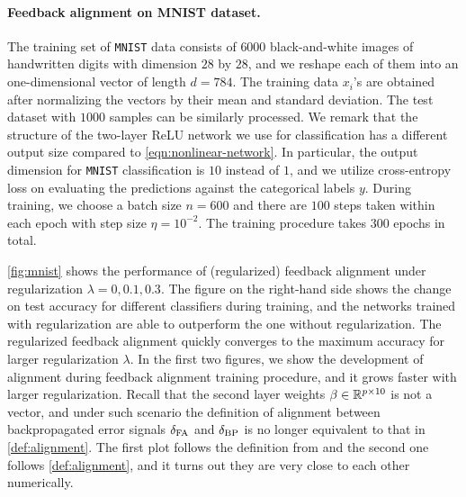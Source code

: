 \paragraph{Feedback alignment on MNIST dataset.}

The training set of \texttt{MNIST} data consists of $6000$ black-and-white images of handwritten digits with dimension $28$ by $28$, and we reshape each of them into an one-dimensional vector of length $d = 784$. The training data $x_i$'s are obtained after normalizing the vectors by their mean and standard deviation. The test dataset with $1000$ samples can be similarly processed. We remark that the structure of the two-layer ReLU network we use for classification has a different output size compared to \eqref{eqn:nonlinear-network}. In particular, the output dimension for \texttt{MNIST} classification is $10$ instead of $1$, and we utilize cross-entropy loss on evaluating the predictions against the categorical labels $y$. During training, we choose a batch size $n = 600$ and there are $100$ steps taken within each epoch with step size $\eta = 10^{-2}$. The training procedure takes $300$ epochs in total. 

\cref{fig:mnist} shows the performance of (regularized) feedback alignment under regularization $\lambda = 0, 0.1, 0.3$. The figure on the right-hand side shows the change on test accuracy for different classifiers during training, and the networks trained with regularization are able to outperform the one without regularization. The regularized feedback alignment quickly converges to the maximum accuracy for larger regularization $\lambda$. In the first two figures, we show the development of alignment during feedback alignment training procedure, and it grows faster with larger regularization. Recall that the second layer weights $\beta\in\mathbb{R}^{p\times 10}$ is not a vector, and under such scenario the definition of alignment between backpropagated error signals $\delta_\mathrm{FA}$ and $\delta_\mathrm{BP}$ is no longer equivalent to that in \cref{def:alignment}. The first plot follows the definition from \citep{lillicrap2016random} and the second one follows \cref{def:alignment}, and it turns out they are very close to each other numerically.

